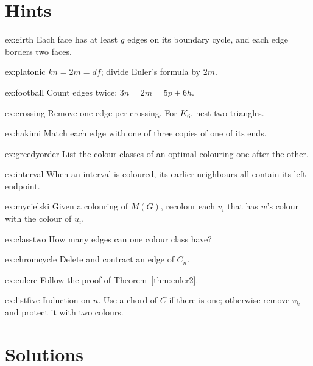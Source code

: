 \section{Hints}

\begin{hint}{ex:girth}
Each face has at least $g$ edges on its boundary cycle, and each edge borders two faces.
\end{hint}
\begin{hint}{ex:platonic}
$kn=2m=df$; divide Euler's formula by $2m$.
\end{hint}
\begin{hint}{ex:football}
Count edges twice: $3n=2m=5p+6h$.
\end{hint}
\begin{hint}{ex:crossing}
Remove one edge per crossing. For $K_6$, nest two triangles.
\end{hint}
\begin{hint}{ex:hakimi}
Match each edge with one of three copies of one of its ends.
\end{hint}
\begin{hint}{ex:greedyorder}
List the colour classes of an optimal colouring one after the other.
\end{hint}
\begin{hint}{ex:interval}
When an interval is coloured, its earlier neighbours all contain its left endpoint.
\end{hint}
\begin{hint}{ex:mycielski}
Given a colouring of $M(G)$, recolour each $v_i$ that has $w$'s colour with the colour of $u_i$.
\end{hint}
\begin{hint}{ex:classtwo}
How many edges can one colour class have?
\end{hint}
\begin{hint}{ex:chromcycle}
Delete and contract an edge of $C_n$.
\end{hint}
\begin{hint}{ex:eulerc}
Follow the proof of Theorem~\ref{thm:euler2}.
\end{hint}
\begin{hint}{ex:listfive}
Induction on $n$. Use a chord of $C$ if there is one; otherwise remove $v_k$ and protect it with two colours.
\end{hint}

\section{Solutions}

